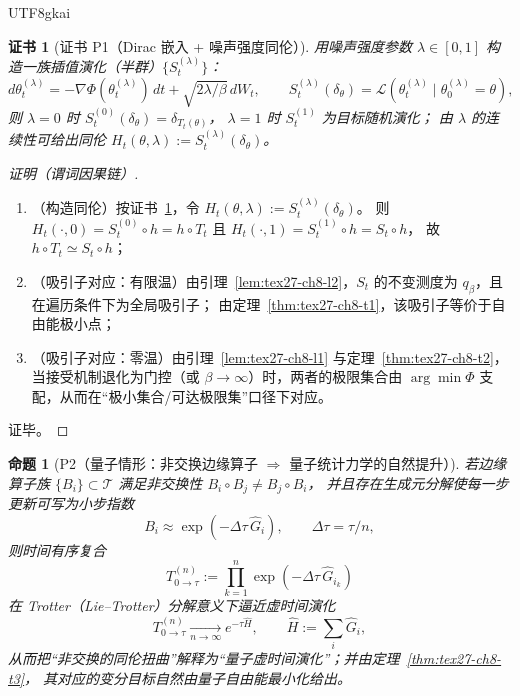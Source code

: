 \documentclass[12pt]{article}
\newtheorem{proposition}{命题}[section]
\newtheorem{Certificate}{证书}[section]
\begin{document}
\begin{CJK*}{UTF8}{gkai}
\begin{Certificate}[证书 P1（Dirac 嵌入 + 噪声强度同伦）]
\label{cert:tex27-ch8-p1}
用噪声强度参数 $\lambda\in[0,1]$ 构造一族插值演化（半群）$\{S_t^{(\lambda)}\}$：
\[
  d\theta_t^{(\lambda)}=-\nabla\Phi(\theta_t^{(\lambda)})\,dt+\sqrt{2\lambda/\beta}\,dW_t,
  \qquad
  S_t^{(\lambda)}(\delta_\theta)=\mathcal{L}(\theta_t^{(\lambda)}\mid \theta_0^{(\lambda)}=\theta),
\]
则 $\lambda=0$ 时 $S_t^{(0)}(\delta_\theta)=\delta_{T_t(\theta)}$，
$\lambda=1$ 时 $S_t^{(1)}$ 为目标随机演化；
由 $\lambda$ 的连续性可给出同伦 $H_t(\theta,\lambda):=S_t^{(\lambda)}(\delta_\theta)$。
\end{Certificate}

\begin{proof}[证明（谓词因果链）]
\begin{enumerate}
  \item（构造同伦）按证书~\ref{cert:tex27-ch8-p1}，令 $H_t(\theta,\lambda):=S_t^{(\lambda)}(\delta_\theta)$。
  则 $H_t(\cdot,0)=S_t^{(0)}\circ h=h\circ T_t$ 且 $H_t(\cdot,1)=S_t^{(1)}\circ h=S_t\circ h$，
  故 $h\circ T_t\simeq S_t\circ h$；
  \item（吸引子对应：有限温）由引理~\ref{lem:tex27-ch8-l2}，$S_t$ 的不变测度为 $q_\beta$，且在遍历条件下为全局吸引子；
  由定理~\ref{thm:tex27-ch8-t1}，该吸引子等价于自由能极小点；
  \item（吸引子对应：零温）由引理~\ref{lem:tex27-ch8-l1} 与定理~\ref{thm:tex27-ch8-t2}，
  当接受机制退化为门控（或 $\beta\to\infty$）时，两者的极限集合由 $\arg\min\Phi$ 支配，从而在“极小集合/可达极限集”口径下对应。
\end{enumerate}
证毕。
\end{proof}

\begin{proposition}[P2（量子情形：非交换边缘算子 $\Rightarrow$ 量子统计力学的自然提升）]
\label{prop:tex27-ch8-p2}
若边缘算子族 $\{B_i\}\subset\mathcal{T}$ 满足非交换性 $B_i\circ B_j\neq B_j\circ B_i$，
并且存在生成元分解使每一步更新可写为小步指数
\[
  B_i \approx \exp(-\Delta\tau\,\widehat{G}_i),
  \qquad
  \Delta\tau=\tau/n,
\]
则时间有序复合
\[
  T_{0\to\tau}^{(n)}:=\prod_{k=1}^{n}\exp(-\Delta\tau\,\widehat{G}_{i_k})
\]
在 Trotter（Lie--Trotter）分解意义下逼近虚时间演化
\[
  T_{0\to\tau}^{(n)}\xrightarrow[n\to\infty]{} e^{-\tau\widehat{H}},
  \qquad
  \widehat{H}:=\sum_i \widehat{G}_i,
\]
从而把“非交换的同伦扭曲”解释为“量子虚时间演化”；并由定理~\ref{thm:tex27-ch8-t3}，
其对应的变分目标自然由量子自由能最小化给出。
\end{proposition}


\end{CJK*}
\end{document}
